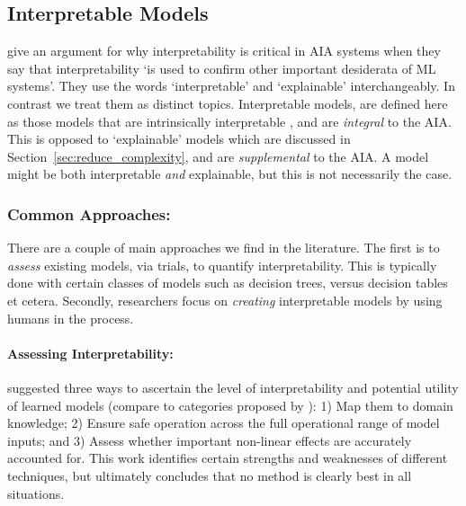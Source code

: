 \subsection{Interpretable Models} \label{sec:interp_models}
\citet{Doshi-Velez2017-xy} give an argument for why interpretability is critical in AIA systems when they say that interpretability `is used to confirm other important desiderata of ML systems'. They use the words `interpretable' and `explainable' interchangeably. In contrast we treat them as distinct topics. Interpretable models, are defined here as those models that are intrinsically interpretable , and are \emph{integral} to the AIA. This is opposed to `explainable' models which are discussed in Section~\ref{sec:reduce_complexity}, and are \emph{supplemental} to the AIA. A model might be both interpretable \emph{and} explainable, but this is not necessarily the case. 

\subsubsection{Common Approaches:}
There are a couple of main approaches we find in the literature. The first is to \emph{assess} existing models, via trials, to quantify interpretability. This is typically done with certain classes of models such as decision trees, versus decision tables et cetera. Secondly, researchers focus on \emph{creating} interpretable models by using humans in the process.

\paragraph{Assessing Interpretability:}
\citet{Van_Belle2013-ph} suggested three ways to ascertain the level of interpretability and potential utility of learned models (compare to categories proposed by \citet{Lipton2016-ug}): 1) Map them to domain knowledge; 2) Ensure safe operation across the full operational range of model inputs; and 3) Assess whether important non-linear effects are accurately accounted for. This work identifies certain strengths and weaknesses of different techniques, but ultimately concludes that no method is clearly best in all situations.

